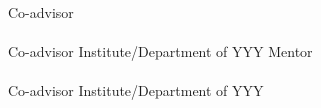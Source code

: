 \documentclass[
10pt, %
english, %
singlespacing, %
headsepline, %
]{MastersDoctoralThesis} %
\begin{document}
\begin{titlepage}
\begin{center}
\large{Co-advisor \\ \examname \\  Co-advisor Institute/Department of YYY}\vspace{0.5cm}
\large{Mentor \\ \examname \\  Co-advisor Institute/Department of YYY}\vspace{0.5cm}

\end{center}
\end{titlepage}
\cleardoublepage




\end{document}

